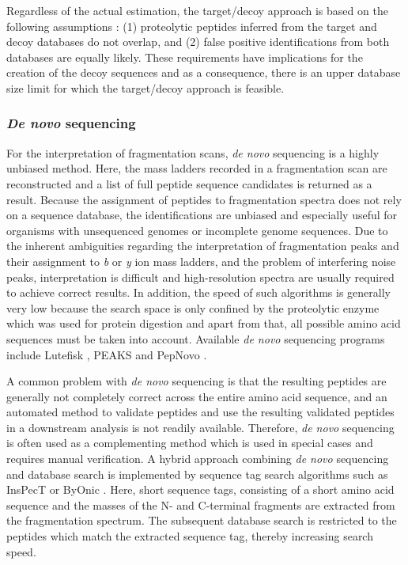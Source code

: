 Regardless of the actual estimation, the target/decoy approach is based on 
the following assumptions \citep{Elias2007}: (1) proteolytic peptides inferred 
from the target and decoy databases do not overlap, and (2) false positive 
identifications from both databases are equally likely.
These requirements have implications for the creation of the decoy sequences
and as a consequence, there is an upper database size limit for which the 
target/decoy approach is feasible.

\subsubsection{{\em De novo} sequencing}

For the interpretation of fragmentation scans, {\em de novo} sequencing is
a highly unbiased method.
Here, the mass ladders recorded in a fragmentation scan are reconstructed
and a list of full peptide sequence candidates is returned as a result.
Because the assignment of peptides to fragmentation spectra does not rely
on a sequence database, the identifications are unbiased and especially
useful for organisms with unsequenced genomes or incomplete genome sequences.
Due to the inherent ambiguities regarding the interpretation of fragmentation
peaks and their assignment to {\em b} or {\em y} ion mass ladders, and the 
problem of interfering noise peaks, interpretation is difficult and 
high-resolution spectra are usually required to achieve correct results.
In addition, the speed of such algorithms is generally very low because the
search space is only confined by the proteolytic enzyme which was used
for protein digestion and apart from that, all possible amino acid sequences
must be taken into account.
Available {\em de novo} sequencing programs include Lutefisk 
\citep{Johnson2002}, PEAKS \citep{Ma2003} and PepNovo \citep{Frank2005}.

A common problem with {\em de novo} sequencing is that the resulting peptides
are generally not completely correct across the entire amino acid sequence, 
and an automated method to validate peptides and use the resulting validated 
peptides in a downstream analysis is not readily available. 
Therefore, {\em de novo} sequencing is often used as a complementing method 
which is used in special cases and requires manual verification.
A hybrid approach combining {\em de novo} sequencing and database search
is implemented by sequence tag search algorithms such as InsPecT 
\citep{Tanner2005} or ByOnic \citep{Bern2007}.
Here, short sequence tags, consisting of a short amino acid sequence and the
masses of the N- and C-terminal fragments are extracted from the fragmentation 
spectrum.
The subsequent database search is restricted to the peptides which match
the extracted sequence tag, thereby increasing search speed.

